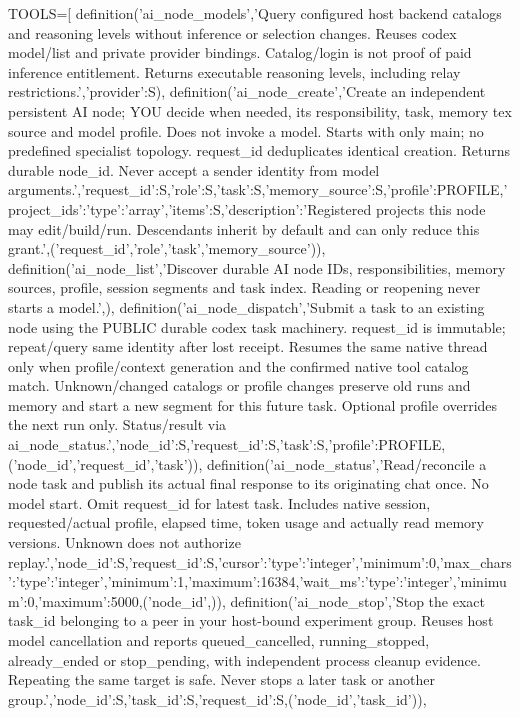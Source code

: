 TOOLS=[
 definition('ai_node_models','Query configured host backend catalogs and reasoning levels without inference or selection changes. Reuses codex model/list and private provider bindings. Catalog/login is not proof of paid inference entitlement. Returns executable reasoning levels, including relay restrictions.',{'provider':S}),
 definition('ai_node_create','Create an independent persistent AI node; YOU decide when needed, its responsibility, task, memory tex source and model profile. Does not invoke a model. Starts with only main; no predefined specialist topology. request_id deduplicates identical creation. Returns durable node_id. Never accept a sender identity from model arguments.',{'request_id':S,'role':S,'task':S,'memory_source':S,'profile':PROFILE,'project_ids':{'type':'array','items':S,'description':'Registered projects this node may edit/build/run. Descendants inherit by default and can only reduce this grant.'}},('request_id','role','task','memory_source')),
 definition('ai_node_list','Discover durable AI node IDs, responsibilities, memory sources, profile, session segments and task index. Reading or reopening never starts a model.',{}),
 definition('ai_node_dispatch','Submit a task to an existing node using the PUBLIC durable codex task machinery. request_id is immutable; repeat/query same identity after lost receipt. Resumes the same native thread only when profile/context generation and the confirmed native tool catalog match. Unknown/changed catalogs or profile changes preserve old runs and memory and start a new segment for this future task. Optional profile overrides the next run only. Status/result via ai_node_status.',{'node_id':S,'request_id':S,'task':S,'profile':PROFILE},('node_id','request_id','task')),
 definition('ai_node_status','Read/reconcile a node task and publish its actual final response to its originating chat once. No model start. Omit request_id for latest task. Includes native session, requested/actual profile, elapsed time, token usage and actually read memory versions. Unknown does not authorize replay.',{'node_id':S,'request_id':S,'cursor':{'type':'integer','minimum':0},'max_chars':{'type':'integer','minimum':1,'maximum':16384},'wait_ms':{'type':'integer','minimum':0,'maximum':5000}},('node_id',)),
 definition('ai_node_stop','Stop the exact task_id belonging to a peer in your host-bound experiment group. Reuses host model cancellation and reports queued_cancelled, running_stopped, already_ended or stop_pending, with independent process cleanup evidence. Repeating the same target is safe. Never stops a later task or another group.',{'node_id':S,'task_id':S,'request_id':S},('node_id','task_id')),
